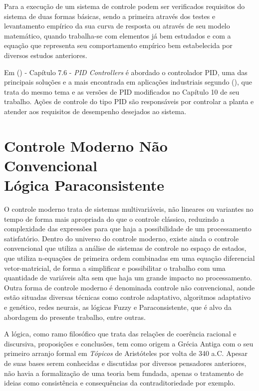 Para a execução de um sistema de controle podem ser verificados requisitos do sistema de duas formas básicas, 
sendo a primeira através dos testes e levantamento empírico da sua curva de resposta ou através de seu modelo matemático, 
quando trabalha-se com elementos já bem estudados e com a equação que representa seu comportamento empírico bem estabelecida por diversos estudos anteriores.


Em \citeauthor{dorf2011modern}(\citeyear{dorf2011modern}) - 
Capítulo 7.6 - \emph{PID Controllers} 
é abordado o controlador PID, 
uma das principais soluções e a mais encontrada em aplicações industriais segundo \citeauthor{Ogata}(\citeyear{Ogata}), 
que trata do mesmo tema e as versões de PID modificados no Capítulo 10 de seu trabalho. 
Ações de controle do tipo PID são responsáveis por controlar a planta e atender aos requisitos de desempenho desejados ao sistema.





\newpage





\section{Controle Moderno Não Convencional \\ Lógica Paraconsistente}

O controle moderno trata de sistemas multivariáveis, não lineares ou variantes no tempo de forma mais apropriada do que o controle clássico, reduzindo a complexidade das expressões para que haja a possibilidade de um processamento satisfatório.
Dentro do universo do controle moderno, existe ainda o controle convencional que utiliza a análise de sistemas de controle no espaço de estados, que utiliza n-equações de primeira ordem combinadas em uma equação diferencial vetor-matricial, de forma a simplificar e possibilitar o trabalho com uma quantidade de variáveis alta sem que haja um grande impacto no processamento.  \cite{Ogata} 
Outra forma de controle moderno é denominada controle não convencional, aonde estão situadas diversas técnicas como controle adaptativo, algoritmos adaptativo e genético, redes neurais, as lógicas Fuzzy e Paraconsistente, que é alvo da abordagem do presente trabalho, entre outras.

A lógica, como ramo filosófico que trata das relações de coerência racional e discursiva, proposições e conclusões, tem como origem a Grécia Antiga com o seu primeiro arranjo formal em \emph{Tópicos} de Aristóteles por volta de 340 a.C. Apesar de suas bases serem conhecidas e discutidas por diversos pensadores anteriores, não havia a formalização de uma teoria bem fundada, apenas o tratamento de ideias como consistência e consequências da contraditoriedade por exemplo. 

